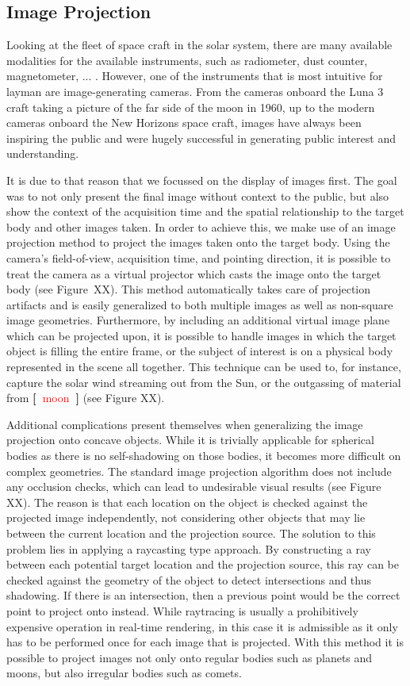 \documentclass{vgtc}                %
\newcommand{\todo}[1]{\textbf{[~}\textcolor {red}{#1}\marginpar{\textcolor {red}{\centerline{{\Huge \textbf{!}}}}}\textbf{~]}}
\begin{document}
\subsection*{Image Projection}
Looking at the fleet of space craft in the solar system, there are many available modalities for the available instruments, such as radiometer, dust counter, magnetometer, ... . However, one of the instruments that is most intuitive for layman are image-generating cameras. From the cameras onboard the Luna 3 craft taking a picture of the far side of the moon in 1960, up to the modern cameras onboard the New Horizons space craft, images have always been inspiring the public and were hugely successful in generating public interest and understanding.

It is due to that reason that we focussed on the display of images first. The goal was to not only present the final image without context to the public, but also show the context of the acquisition time and the spatial relationship to the target body and other images taken. In order to achieve this, we make use of an image projection method \cite{ImageProjection} to project the images taken onto the target body. Using the camera's field-of-view, acquisition time, and pointing direction, it is possible to treat the camera as a virtual projector which casts the image onto the target body (see Figure~XX). This method automatically takes care of projection artifacts and is easily generalized to both multiple images as well as non-square image geometries. Furthermore, by including an additional virtual image plane which can be projected upon, it is possible to handle images in which the target object is filling the entire frame, or the subject of interest is on a physical body represented in the scene all together. This technique can be used to, for instance, capture the solar wind streaming out from the Sun, or the outgassing of material from \todo{moon} (see Figure XX).

Additional complications present themselves when generalizing the image projection onto concave objects. While it is trivially applicable for spherical bodies as there is no self-shadowing on those bodies, it becomes more difficult on complex geometries. The standard image projection algorithm does not include any occlusion checks, which can lead to undesirable visual results (see Figure XX). The reason is that each location on the object is checked against the projected image independently, not considering other objects that may lie between the current location and the projection source. The solution to this problem lies in applying a raycasting type approach. By constructing a ray between each potential target location and the projection source, this ray can be checked against the geometry of the object to detect intersections and thus shadowing. If there is an intersection, then a previous point would be the correct point to project onto instead. While raytracing is usually a prohibitively expensive operation in real-time rendering, in this case it is admissible as it only has to be performed once for each image that is projected. With this method it is possible to project images not only onto regular bodies such as planets and moons, but also irregular bodies such as comets.
\end{document}
